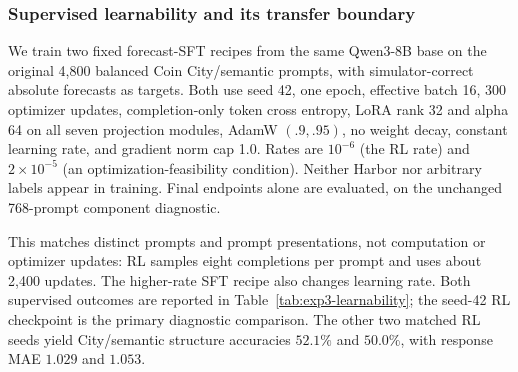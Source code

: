 \begin{table}[htbp]
\centering\small

\caption{\textbf{Post hoc Qwen3-32B audit of incorrectly offset answers.}
The first three numeric columns are unclipped response MAE. Exact means all
eight relative response coordinates are within $.01$ of truth; Omit rest means
both zero-shock predictions are near zero. These last two columns concern the
selected-pattern interface only. They do not measure correct absolute forecasts.}
\label{tab:exp3-baseline-audit}
\end{table}

\subsubsection{Supervised learnability and its transfer boundary}
\label{app:exp3-learnability}

We train two fixed forecast-SFT recipes from the same Qwen3-8B base on the
original 4,800 balanced Coin City/semantic prompts, with simulator-correct
absolute forecasts as targets. Both use seed 42, one epoch, effective batch 16,
300 optimizer updates, completion-only token cross entropy, LoRA rank 32 and
alpha 64 on all seven projection modules, AdamW $(.9,.95)$, no weight decay,
constant learning rate, and gradient norm cap 1.0. Rates are $10^{-6}$ (the RL
rate) and $2\times10^{-5}$ (an optimization-feasibility condition). Neither
Harbor nor arbitrary labels appear in training. Final endpoints alone are
evaluated, on the unchanged 768-prompt component diagnostic.

This matches distinct prompts and prompt presentations, not computation or
optimizer updates: RL samples eight completions per prompt and uses about
2,400 updates. The higher-rate SFT recipe also changes learning rate. Both
supervised outcomes are reported in Table~\ref{tab:exp3-learnability}; the
seed-42 RL checkpoint is the primary diagnostic comparison. The other two
matched RL seeds yield City/semantic structure accuracies $52.1\%$ and
$50.0\%$, with response MAE $1.029$ and $1.053$.

\begin{table}[htbp]
\centering\small
\setlength{\tabcolsep}{4pt}

\caption{\textbf{A supervised recipe learns in-domain structure selection but
fails to transfer.} All trained recipes here use seed 42. Structure accuracy
is derived from forecasts, not reference naming. All outputs parse. Intervals
resample the 24 paired episodes within each cell (2,000 draws); they do not
capture training-seed uncertainty. Both fixed SFT learning rates are retained.}
\label{tab:exp3-learnability}
\end{table}

